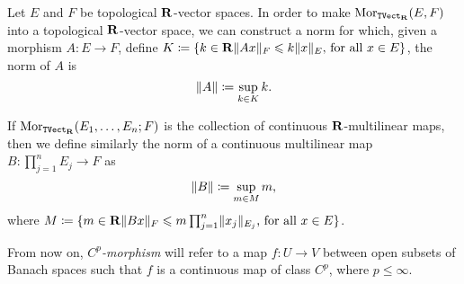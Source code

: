 \begin{definition}
    \label{def:norm-morphism-TopVect}
    Let \(E\) and \(F\) be topological \(\mathbf{R}\)-vector spaces. In order to make
    \(\operatorname{Mor}_{{\texttt{TVect}}_{\mathbf{R}}}(E, F)\) into a topological \(\mathbf{R}\)-vector space, we can
    construct a norm for which, given a morphism \(A: E \to F\), define \(K \coloneq
    \{k \in \mathbf{R} \relax \lVert Ax\rVert_{F} \leqslant k \lVert x\rVert_E \text{, for all } x \in E\}\), the
    norm of \(A\) is
    \[
        \lVert A\rVert \coloneq \sup_{k \in K} k.
    \]

    If \(\operatorname{Mor}_{{\texttt{TVect}}_{\mathbf{R}}}(E_1, \dots, E_n; F)\) is the collection of continuous
    \(\mathbf{R}\)-multilinear maps, then we define similarly the norm of a continuous
    multilinear map \(B: \prod_{j=1}^n E_j \to F\) as
    \[
        \lVert B\rVert \coloneq \sup_{m \in M} m,
    \]
    where \(M \coloneq \{m \in \mathbf{R} \relax \lVert Bx\rVert_F \leqslant m \prod_{j=1}^n
    \lVert x_j\rVert_{E_j} \text{, for all } x \in E\}\).
\end{definition}

\begin{remark}
    \label{rm:Cp-morphism}
    From now on, \emph{\(C^p\)-morphism} will refer to a map \(f: U \to V\) between
    open subsets of Banach spaces such that \(f\) is a continuous map of class
    \(C^p\), where \(p \leq \infty\).
\end{remark}

